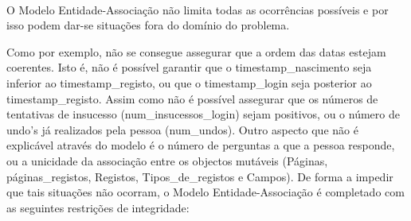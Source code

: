 \documentclass[11pt,a4paper]{article}
\begin{document}
\paragraph{}

O Modelo Entidade-Associação não limita todas as ocorrências possíveis e por isso podem dar-se situações fora do domínio do problema.

Como por exemplo, não se consegue assegurar que a ordem das datas estejam coerentes. Isto é, não é possível garantir que o timestamp\_nascimento seja inferior ao timestamp\_registo, ou que o timestamp\_login seja posterior ao timestamp\_registo.
Assim como não é possível assegurar que os números de tentativas de insucesso (num\_insucessos\_login) sejam positivos, ou o número de undo’s já realizados pela pessoa (num\_undos).
Outro aspecto que não é explicável através do modelo é o número de perguntas a que a pessoa responde, ou a unicidade da associação entre os objectos mutáveis (Páginas, páginas\_registos, Registos, Tipos\_de\_registos e Campos).
De forma a impedir que tais situações não ocorram, o Modelo Entidade-Associação é completado com as seguintes restrições de integridade:
\\
\end{document}

